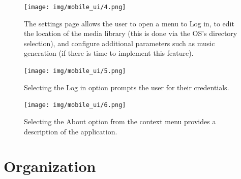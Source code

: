 \documentclass[letterpaper,english, 12pt]{scrreprt}
\begin{document}
\begin{figure}[H]
	\centering
	\texttt{[image: img/mobile\_ui/4.png]}\\
	\caption{The settings page allows the user to open a menu to Log in, to edit the location of the media library (this is done via the OS's directory selection), and configure additional parameters such as music generation (if there is time to implement this feature).}
\end{figure}

\begin{figure}[H]
	\centering
	\texttt{[image: img/mobile\_ui/5.png]}\\
	\caption{Selecting the Log in option prompts the user for their credentials.}
\end{figure}

\begin{figure}[H]
	\centering
	\texttt{[image: img/mobile\_ui/6.png]}\\
	\caption{Selecting the About option from the context menu provides a description of the application.}
\end{figure}


\section{Organization}
\end{document}
